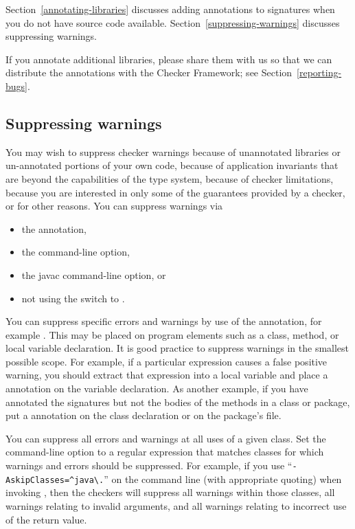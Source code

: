 Section~\ref{annotating-libraries} discusses adding annotations to
signatures when you do not have source code available.
Section~\ref{suppressing-warnings} discusses suppressing warnings.


If you annotate additional libraries, please share them with us so that we
can distribute the annotations with the Checker Framework; see
Section~\ref{reporting-bugs}.


\subsection{Suppressing warnings\label{suppressing-warnings}}

You may wish to suppress checker warnings because of unannotated libraries
or un-annotated portions of your own code, because of application
invariants that are beyond the capabilities of the type system, because of
checker limitations, because you are interested in only some of the
guarantees provided by a checker, or for other reasons.  You can suppress
warnings via
\begin{itemize}
\item
  the  annotation,
\item
  the  command-line option,
\item
  the javac  command-line option, or
\item
  not using the  switch to .
\end{itemize}

You can suppress specific errors and warnings by use of the
 annotation, for example
.
This may be placed on program elements such as a class, method, or local
variable declaration.  It is good practice to suppress warnings in the
smallest possible scope.  For example, if a particular expression causes a
false positive warning, you should extract that expression into a local variable
and place a  annotation on the variable
declaration.
As another example, if you have annotated the signatures but not the bodies
of the methods in a class or package, put a 
annotation on the class declaration or on the package's
 file.

You can suppress all errors and warnings at all uses of a given class.
Set the  command-line option to a
regular expression that matches classes for which warnings and errors
should be suppressed.  For example, if you use
``{\codesize\verb|-AskipClasses=^java\.|}'' on the command line
(with appropriate quoting) when invoking
, then the checkers will suppress all warnings within those
classes, all warnings relating to invalid arguments, and all warnings
relating to incorrect use of the return value.

